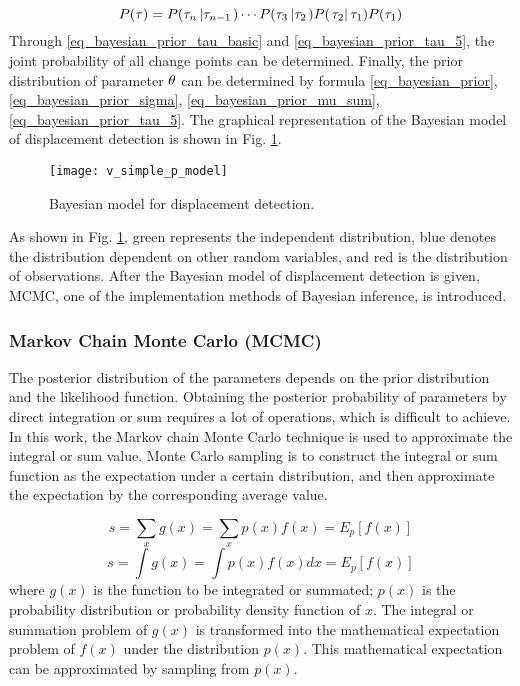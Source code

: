 \documentclass{svjour3}                     %
\begin{document}
\begin{equation}\label{eq_bayesian_prior_tau_5}
P({\bf{\tau }}) = P({\tau _n}\left| {{\tau _{n - 1}}} \right.) \cdots P({\tau _3}\left| {{\tau _2}} \right.)P(\left. {{\tau _2}} \right|{\tau _1})P({\tau _1})
\end{equation}
Through \ref{eq_bayesian_prior_tau_basic} and \ref{eq_bayesian_prior_tau_5}, the joint probability of all change points can be determined. Finally, the prior distribution of parameter ${\bf{\theta }}$ can be determined by formula \ref{eq_bayesian_prior}, \ref{eq_bayesian_prior_sigma}, \ref{eq_bayesian_prior_mu_sum}, \ref{eq_bayesian_prior_tau_5}. The graphical representation of the Bayesian model of displacement detection is shown in Fig. \ref{fig_v_simple_p_model}.
\begin{figure}[H]
	\centering
	\texttt{[image: v\_simple\_p\_model]}
	\caption{Bayesian model for displacement detection.}
	\label{fig_v_simple_p_model}
\end{figure} 
As shown in Fig. \ref{fig_v_simple_p_model}, green represents the independent distribution, blue denotes the distribution dependent on other random variables, and red is the distribution of observations. After the Bayesian model of displacement detection is given, MCMC, one of the implementation methods of Bayesian inference, is introduced.

\subsubsection{Markov Chain Monte Carlo (MCMC)}
The posterior distribution of the parameters depends on the prior distribution and the likelihood function. Obtaining the posterior probability of parameters by direct integration or sum requires a lot of operations, which is difficult to achieve. In this work, the Markov chain Monte Carlo technique is used to approximate the integral or sum value. Monte Carlo sampling is to construct the integral or sum function as the expectation under a certain distribution, and then approximate the expectation by the corresponding average value\citep{goodfellow2016deep}.

\begin{equation}\label{eq_monte_carlo_1}
s =\sum\limits_x g(x)= \sum\limits_x {p(x)f(x) = {E_p}[f(x)]}
\end{equation}
\begin{equation}\label{eq_monte_carlo_2}
s =\int {g(x)}= \int {p(x)f(x)dx}  = {E_p}[f(x)]
\end{equation}
where $g(x)$ is the function to be integrated or summated; $p(x)$ is the probability distribution or probability density function of $x$. The integral or summation problem of $g(x)$ is transformed into the mathematical expectation problem of $f(x)$ under the distribution $p(x)$. This mathematical expectation can be approximated by sampling from $p(x)$.
\end{document}
